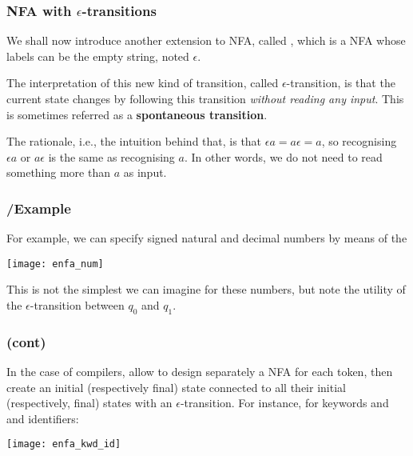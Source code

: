 
% 
\begin{frame}
\frametitle{NFA with \(\epsilon\)-transitions}

We shall now introduce another extension to NFA, called \eNFA, which
is a NFA whose labels can be the empty string, noted \(\epsilon\). 

\bigskip

The interpretation of this new kind of transition, called
\(\epsilon\)-transition, is that the current state changes by
following this transition \emph{without reading any input}. This is
sometimes referred as a \textbf{spontaneous transition}.

\bigskip

The rationale, i.e., the intuition behind that, is that \(\epsilon a =
a \epsilon = a\), so recognising \(\epsilon a\) or \(a\epsilon\) is
the same as recognising \(a\). In other words, we do not need to read
something more than \(a\) as input.

\end{frame}

% 
\begin{frame}
\frametitle{\eNFA{}/Example}

\label{enfa_num}

For example, we can specify signed natural and decimal numbers by
means of the \eNFA
\begin{center}
\texttt{[image: enfa\_num]}
\end{center}
This is not the simplest \eNFA we can imagine for these numbers, but
note the utility of the \(\epsilon\)-transition between \(q_0\) and
\(q_1\).

\end{frame}

% 
\begin{frame}
\frametitle{\eNFA (cont)}

In the case of compilers, \eNFA allow to design separately a NFA
for each token, then create an initial (respectively final) state
connected to all their initial (respectively, final) states with an
\(\epsilon\)-transition. For instance, for keywords  and
 and identifiers:
\begin{center}
\texttt{[image: enfa\_kwd\_id]}
\end{center}

\end{frame}

